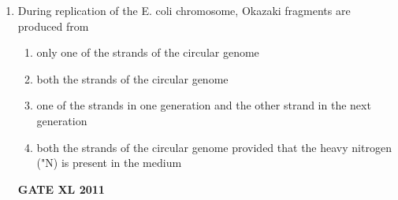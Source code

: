 \documentclass[journal,12pt,onecolumn]{IEEEtran}
\begin{document}
\begin{enumerate}
\begin{minipage}{0.5\textwidth}
\begin{flushleft}
Group 1

P. Joseph Lister

Q. John Needham

R. Elie Metchnikoff

S. Lazaro Spallanzani
		\end{flushleft}
		\end{minipage}
	\begin{minipage}{0.5\textwidth}
		\begin{flushleft}

Group 2

1. Role of phagocytosis in infection


2. Disproved spontaneous generation


3. Proved Spontaneous generation


4. Use of agar as solidifying agent

5. Use of carbolic acid as disinfectant
		\end{flushleft}
		\end{minipage}

\begin{multicols}{4}
		\begin{enumerate}
			\item P-5,Q-3.R-4.S-1
			\item P-5,Q-3,R-1,S-2
			\item P-4.Q-3R-1,S-5
			\item P-3,Q-2,R-1.5-4
		\end{enumerate}
\end{multicols}
		\hfill{\textbf{GATE XL 2011}}

	\item {During replication of the E. coli chromosome, Okazaki fragments are produced from}

		\begin{enumerate}
			\item only one of the strands of the circular genome
			\item both the strands of the circular genome
			\item one of the strands in one generation and the other strand in the next generation
			\item both the strands of the circular genome provided that the heavy nitrogen ("N) is present in the medium
		\end{enumerate}
		\hfill{\textbf{GATE XL 2011}}


\end{enumerate}
\end{document}
